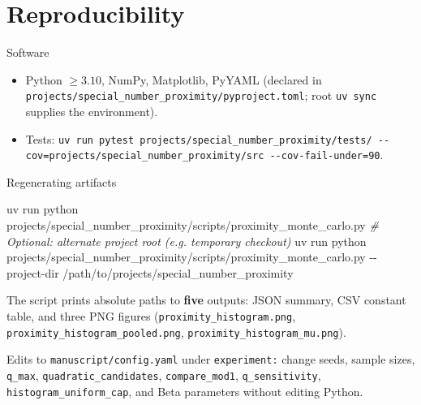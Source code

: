 \documentclass[
  ignorenonframetext,
]{beamer}
\author{\texorpdfstring{}{}}
\date{}
\newenvironment{Shaded}{}{}
\newcommand{\AttributeTok}[1]{\textcolor[rgb]{0.49,0.56,0.16}{#1}}
\newcommand{\CommentTok}[1]{\textcolor[rgb]{0.38,0.63,0.69}{\textit{#1}}}
\newcommand{\ExtensionTok}[1]{#1}
\newcommand{\NormalTok}[1]{#1}
\providecommand{\tightlist}{%
  \setlength{\itemsep}{0pt}\setlength{\parskip}{0pt}}
\begin{document}
\section{Reproducibility}\label{reproducibility}

\begin{frame}[fragile]{Software}
\protect{}\label{software}
\begin{itemize}
\tightlist
\item
  Python \(\geq 3.10\), NumPy, Matplotlib, PyYAML (declared in
  \texttt{projects/special\_number\_proximity/pyproject.toml}; root
  \texttt{uv\ sync} supplies the environment).
\item
  Tests:
  \texttt{uv\ run\ pytest\ projects/special\_number\_proximity/tests/\ -\/-cov=projects/special\_number\_proximity/src\ -\/-cov-fail-under=90}.
\end{itemize}
\end{frame}

\begin{frame}[fragile]{Regenerating artifacts}
\protect{}\label{regenerating-artifacts}
\begin{Shaded}
\begin{Highlighting}[]
\ExtensionTok{uv}\NormalTok{ run python projects/special\_number\_proximity/scripts/proximity\_monte\_carlo.py}
\CommentTok{\# Optional: alternate project root (e.g. temporary checkout)}
\ExtensionTok{uv}\NormalTok{ run python projects/special\_number\_proximity/scripts/proximity\_monte\_carlo.py }\AttributeTok{{-}{-}project{-}dir}\NormalTok{ /path/to/projects/special\_number\_proximity}
\end{Highlighting}
\end{Shaded}

The script prints absolute paths to \textbf{five} outputs: JSON summary,
CSV constant table, and three PNG figures
(\texttt{proximity\_histogram.png},
\texttt{proximity\_histogram\_pooled.png},
\texttt{proximity\_histogram\_mu.png}).

Edits to \texttt{manuscript/config.yaml} under \texttt{experiment:}
change seeds, sample sizes, \texttt{q\_max},
\texttt{quadratic\_candidates}, \texttt{compare\_mod1},
\texttt{q\_sensitivity}, \texttt{histogram\_uniform\_cap}, and Beta
parameters without editing Python.
\end{frame}
\end{document}
